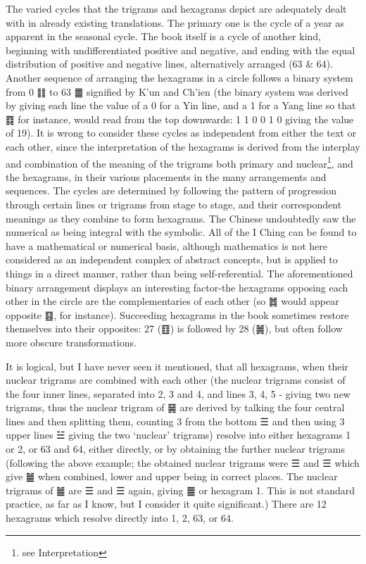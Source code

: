 \documentclass[11pt]{book}
\begin{document}
The varied cycles that the trigrams and hexagrams depict are adequately dealt with in already existing translations. The primary one is the cycle of a year as apparent in the seasonal cycle. The book itself is a cycle of another kind, beginning with undifferentiated positive and negative, and ending with the equal distribution of positive and negative lines, alternatively arranged (63 \& 64). Another sequence of arranging the hexagrams in a circle follows a binary system from 0 ䷁ to 63 ䷀ signified by K'un and Ch'ien (the binary system was derived by giving each line the value of a 0 for a Yin line, and a 1 for a Yang line so that ䷺ for instance, would read from the top downwards: 1 1 0 0 1 0 giving the value of 19). It is wrong to consider these cycles as independent from either the text or each other, since the interpretation of the hexagrams is derived from the interplay and combination of the meaning of the trigrams both primary and nuclear\footnote{see Interpretation}, and the hexagrams, in their various placements in the many arrangements and sequences. The cycles are determined by following the pattern of progression through certain lines or trigrams from stage to stage, and their correspondent meanings as they combine to form hexagrams. The Chinese undoubtedly saw the numerical as being integral with the symbolic. All of the I Ching can be found to have a mathematical or numerical basis, although mathematics is not here considered as an independent complex of abstract concepts, but is applied to things in a direct manner, rather than being self-referential. The aforementioned binary arrangement displays an interesting factor-the hexagrams opposing each other in the circle are the complementaries of each other (so ䷮ would appear opposite ䷕, for instance). Succeeding hexagrams in the book sometimes restore themselves into their opposites: 27 (䷚) is followed by 28 (䷛), but often follow more obscure transformations.

It is logical, but I have never seen it mentioned, that all hexagrams, when their nuclear trigrams are combined with each other (the nuclear trigrams consist of the four inner lines, separated into 2, 3 and 4, and lines 3, 4, 5 - giving two new trigrams, thus the nuclear trigram of ䷱ are derived by talking the four central lines and then splitting them, counting 3 from the bottom ☰ and then using 3 upper lines ☱ giving the two `nuclear' trigrams) resolve into either hexagrams 1 or 2, or 63 and 64, either directly, or by obtaining the further nuclear trigrams (following the above example; the obtained nuclear trigrams were ☰ and ☰ which give ䷪ when combined, lower and upper being in correct places. The nuclear trigrams of ䷪ are ☰ and ☰ again, giving ䷀ or hexagram 1. This is not standard practice, as far as I know, but I consider it quite significant.) There are 12 hexagrams which resolve directly into 1, 2, 63, or 64.
\end{document}
